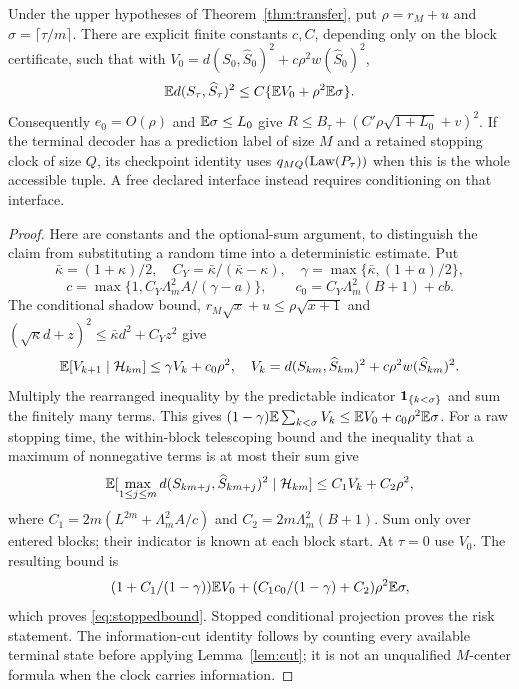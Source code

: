\begin{proposition}\label{prop:stopped}
Under the upper hypotheses of Theorem~\ref{thm:transfer}, put $\rho=r_M+u$ and $\sigma=\lceil\tau/m\rceil$. There are explicit finite constants $c,C$, depending only on the block certificate, such that with
$V_0=d(S_0,\widehat S_0)^2+c\rho^2w(\widehat S_0)^2$,
\begin{equation}\label{eq:stoppedbound}
 \mathbb E d(S_\tau,\widehat S_\tau)^2
 \le C\{\mathbb E V_0+\rho^2\mathbb E\sigma\}.
\end{equation}
Consequently $e_0=O(\rho)$ and $\mathbb E\sigma\le L_0$ give
$R\le B_\tau+(C'\rho\sqrt{1+L_0}+v)^2$.
If the terminal decoder has a prediction label of size $M$ and a retained stopping clock of size $Q$, its checkpoint identity uses $q_{MQ}(\operatorname{Law}(P_\tau))$ when this is the whole accessible tuple. A free declared interface instead requires conditioning on that interface.
\end{proposition}
\begin{proof}
Here are constants and the optional-sum argument, to distinguish the claim from substituting a random time into a deterministic estimate. Put
\[
 \bar\kappa=(1+\kappa)/2,\quad C_Y=\bar\kappa/(\bar\kappa-\kappa),
 \quad\gamma=\max\{\bar\kappa,(1+a)/2\},
\]
\[
 c=\max\{1,C_Y\Lambda_m^2A/(\gamma-a)\},\qquad
 c_0=C_Y\Lambda_m^2(B+1)+cb.
\]
The conditional shadow bound, $r_M\sqrt{x}+u\le\rho\sqrt{x+1}$ and
$(\sqrt\kappa d+z)^2\le\bar\kappa d^2+C_Yz^2$ give
\[
 \mathbb E[V_{k+1}\mid\mathcal H_{km}]\le\gamma V_k+c_0\rho^2,
 \quad V_k=d(S_{km},\widehat S_{km})^2+c\rho^2w(\widehat S_{km})^2.
\]
Multiply the rearranged inequality by the predictable indicator $\mathbf 1_{\{k<\sigma\}}$ and sum the finitely many terms. This gives
$(1-\gamma)\mathbb E\sum_{k<\sigma}V_k\le\mathbb E V_0+c_0\rho^2\mathbb E\sigma$.
For a raw stopping time, the within-block telescoping bound and the inequality that a maximum of nonnegative terms is at most their sum give
\[
 \mathbb E[\max_{1\le j\le m}d(S_{km+j},\widehat S_{km+j})^2\mid\mathcal H_{km}]
 \le C_1V_k+C_2\rho^2,
\]
where $C_1=2m(L^{2m}+\Lambda_m^2A/c)$ and $C_2=2m\Lambda_m^2(B+1)$. Sum only over entered blocks; their indicator is known at each block start. At $\tau=0$ use $V_0$. The resulting bound is
\[
 (1+C_1/(1-\gamma))\mathbb E V_0+
 (C_1c_0/(1-\gamma)+C_2)\rho^2\mathbb E\sigma,
\]
which proves \eqref{eq:stoppedbound}. Stopped conditional projection proves the risk statement. The information-cut identity follows by counting every available terminal state before applying Lemma~\ref{lem:cut}; it is not an unqualified $M$-center formula when the clock carries information.
\end{proof}

